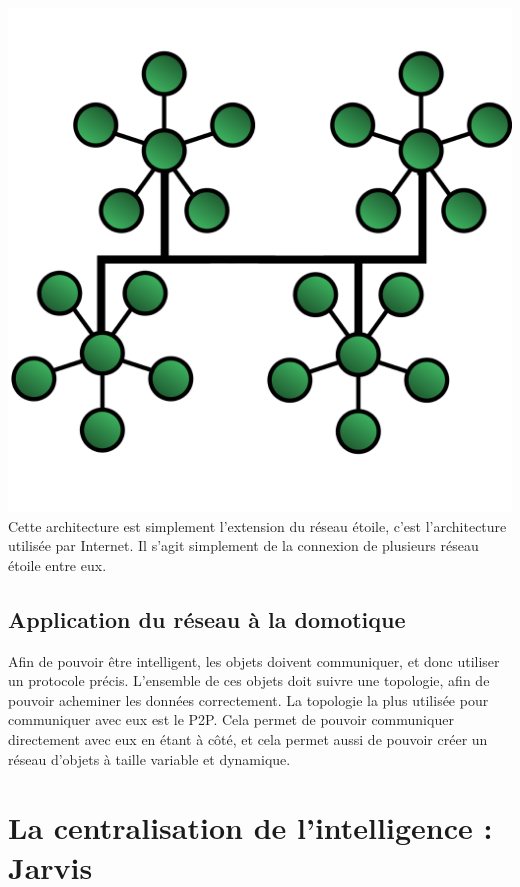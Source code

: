 \includegraphics{img/TreeTopology.png}
Cette architecture est simplement l'extension du réseau étoile, c'est l'architecture utilisée par Internet. 
Il s'agit simplement de la connexion de plusieurs réseau étoile entre eux.
	\subsection{Application du réseau à la domotique}
Afin de pouvoir être intelligent, les objets doivent communiquer, et donc utiliser un protocole précis. 
L'ensemble de ces objets doit suivre une topologie, afin de pouvoir acheminer les données correctement. La 
topologie la plus utilisée pour communiquer avec eux est le P2P. Cela permet de pouvoir communiquer 
directement avec eux en étant à côté, et cela permet aussi de pouvoir créer un réseau d'objets à taille 
variable et dynamique.


\section{La centralisation de l’intelligence : Jarvis}
